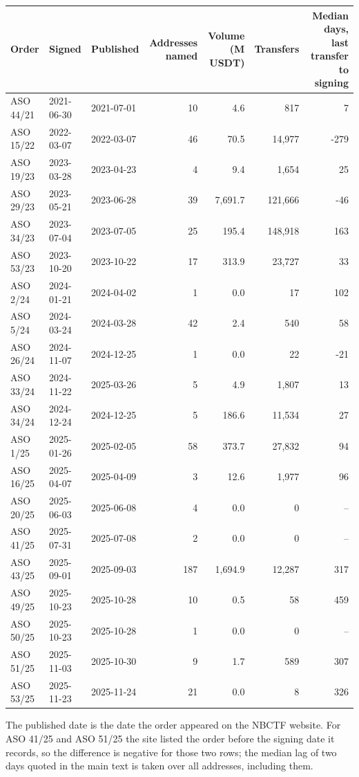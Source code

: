 \begin{tabular}{lllrrrr}
\toprule
\textbf{Order} & \textbf{Signed} & \textbf{Published} & \textbf{Addresses named} & \textbf{Volume (M USDT)} & \textbf{Transfers} & \textbf{Median days, last transfer to signing} \\
\midrule
ASO 44/21 & 2021-06-30 & 2021-07-01 & 10 & 4.6 & 817 & 7 \\
ASO 15/22 & 2022-03-07 & 2022-03-07 & 46 & 70.5 & 14,977 & -279 \\
ASO 19/23 & 2023-03-28 & 2023-04-23 & 4 & 9.4 & 1,654 & 25 \\
ASO 29/23 & 2023-05-21 & 2023-06-28 & 39 & 7,691.7 & 121,666 & -46 \\
ASO 34/23 & 2023-07-04 & 2023-07-05 & 25 & 195.4 & 148,918 & 163 \\
ASO 53/23 & 2023-10-20 & 2023-10-22 & 17 & 313.9 & 23,727 & 33 \\
ASO 2/24 & 2024-01-21 & 2024-04-02 & 1 & 0.0 & 17 & 102 \\
ASO 5/24 & 2024-03-24 & 2024-03-28 & 42 & 2.4 & 540 & 58 \\
ASO 26/24 & 2024-11-07 & 2024-12-25 & 1 & 0.0 & 22 & -21 \\
ASO 33/24 & 2024-11-22 & 2025-03-26 & 5 & 4.9 & 1,807 & 13 \\
ASO 34/24 & 2024-12-24 & 2024-12-25 & 5 & 186.6 & 11,534 & 27 \\
ASO 1/25 & 2025-01-26 & 2025-02-05 & 58 & 373.7 & 27,832 & 94 \\
ASO 16/25 & 2025-04-07 & 2025-04-09 & 3 & 12.6 & 1,977 & 96 \\
ASO 20/25 & 2025-06-03 & 2025-06-08 & 4 & 0.0 & 0 & -- \\
ASO 41/25 & 2025-07-31 & 2025-07-08 & 2 & 0.0 & 0 & -- \\
ASO 43/25 & 2025-09-01 & 2025-09-03 & 187 & 1,694.9 & 12,287 & 317 \\
ASO 49/25 & 2025-10-23 & 2025-10-28 & 10 & 0.5 & 58 & 459 \\
ASO 50/25 & 2025-10-23 & 2025-10-28 & 1 & 0.0 & 0 & -- \\
ASO 51/25 & 2025-11-03 & 2025-10-30 & 9 & 1.7 & 589 & 307 \\
ASO 53/25 & 2025-11-23 & 2025-11-24 & 21 & 0.0 & 8 & 326 \\
\bottomrule
\end{tabular}

\vspace{2pt}
{\footnotesize The published date is the date the order appeared on the NBCTF website. For ASO 41/25 and ASO 51/25 the site listed the order before the signing date it records, so the difference is negative for those two rows; the median lag of two days quoted in the main text is taken over all addresses, including them.}
